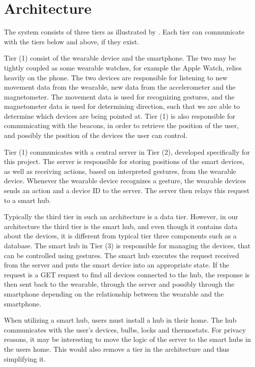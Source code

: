 \section{Architecture}\label{sec:architecture}
The system consists of three tiers as illustrated by . 
Each tier can communicate with the tiers below and above, if they exist.

Tier (1) consist of the wearable device and the smartphone.
The two may be tightly coupled as some wearable watches, 
for example the Apple Watch, relies heavily on the phone. 
The two devices are responsible for listening to new movement data from the wearable, 
\eg new data from the accelerometer and the magnetometer.
The movement data is used for recognizing gestures, 
and the magnetometer data is used for determining direction, 
such that we are able to determine which devices are being pointed at. 
Tier (1) is also responsible for communicating with the beacons, 
in order to retrieve the position of the user, 
and possibly the position of the devices the user can control. 

Tier (1) communicates with a central server in Tier (2), 
developed specifically for this project. 
The server is responsible for storing positions of the smart devices, 
as well as receiving actions, based on interpreted gestures, from the wearable device.
Whenever the wearable device recognizes a gesture, 
the wearable devices sends an action and a device ID to the server.
The server then relays this request to a smart hub. 

Typically the third tier in such an architecture is a data tier. 
However, in our architecture the third tier is the smart hub, 
and even though it contains data about the devices, 
it is different from typical tier three components such as a database. 
The smart hub in Tier (3) is responsible for managing the devices, 
that can be controlled using gestures. 
The smart hub executes the request received from the server and puts the smart device into an appropriate state.
If the request is a GET request to find all devices connected to the hub, 
the response is then sent back to the wearable, through the server
and possibly through the smartphone depending on the relationship between the wearable and the smartphone. 

When utilizing a smart hub, users must install a hub in their home. 
The hub communicates with the user's devices, \eg bulbs, locks and thermostats. 
For privacy reasons, it may be interesting to move the logic of the server to the smart hubs in the users home. 
This would also remove a tier in the architecture and thus simplifying it.


